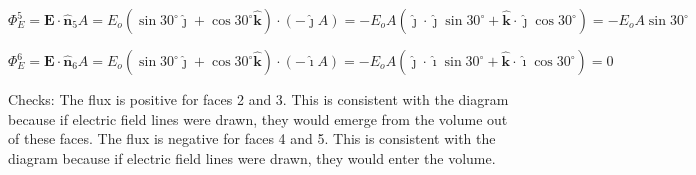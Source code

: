 \documentclass{article}
\newcommand{\ihat}[0]{\hat{\boldsymbol{\imath}}}
\newcommand{\jhat}[0]{\hat{\boldsymbol{\jmath}}}
\newcommand{\khat}[0]{\hat{\boldsymbol{k}}}
\begin{document}
$$\Phi_E^5=\mathbf{E}\cdot \hat{\mathbf{n}}_5A=E_o(\sin 30^\circ\jhat+\cos 30^\circ\khat)\cdot(-\jhat A) = -E_oA(\jhat\cdot\jhat\sin 30^\circ+\khat\cdot\jhat\cos 30^\circ)=-E_oA\sin 30^\circ$$

$$\Phi_E^6=\mathbf{E}\cdot \hat{\mathbf{n}}_6A=E_o(\sin 30^\circ\jhat+\cos 30^\circ\khat)\cdot(-\ihat A) =  -E_oA(\jhat\cdot\ihat\sin 30^\circ+\khat\cdot\ihat\cos 30^\circ)=0$$

Checks: The flux is positive for faces 2 and 3. This is consistent with the diagram because if electric field lines were drawn, they would emerge from the volume out of these faces. The flux is negative for faces 4 and 5. This is consistent with the diagram because if electric field lines were drawn, they would enter the volume.
\fi
\end{document}
